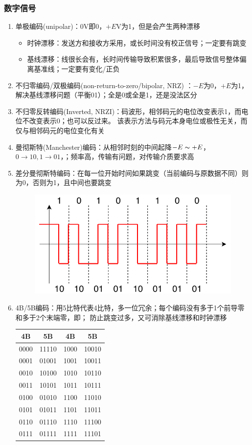 \subsubsection{数字信号}
\begin{enumerate}
\item 单极编码(unipolar)：0V即0，$+E$V为1，但是会产生两种漂移
\begin{itemize}
	\item 时钟漂移：发送方和接收方采用，或长时间没有校正信号；一定要有跳变
	\item 基线漂移：线很长会有，长时间传输导致积累很多，最后导致信号整体偏离基准线；一定要有变化/正负
\end{itemize}
\item 不归零编码/双极编码(non-return-to-zero/bipolar, NRZ) ：$-E$为0，$+E$为1，解决基线漂移问题（平衡01）；全是0或全是1，还是没法区分
\item 不归零反转编码(Inverted, NRZI)：码波形，相邻码元的电位改变表示1，而电位不改变表示0；也可以反过来。 该表示方法与码元本身电位或极性无关，而仅与相邻码元的电位变化有关
\item 曼彻斯特(Manchester)编码：从相邻时刻的中间起降$-E\thicksim +E$，$0\to 10, 1\to 01$，；频率高，传输有问题，对传输介质要求高
\item 差分曼彻斯特编码：在每一位开始时间如果跳变（当前编码与原数据不同）则为0，否则为1，且中间也要跳变
\begin{figure}[H]
	\centering
	\includegraphics[width=0.5\linewidth]{fig/network-manchester.pdf}
\end{figure}
\item 4B/5B编码：用5比特代表4比特，多一位冗余；每个编码没有多于1个前导零和多于2个末端零，即；
防止跳变过多，又可消除基线漂移和时钟漂移
\begin{center}
\begin{tabular}{|c|c||c|c|}\hline
4B & 5B & 4B & 5B\\\hline\hline
0000 & 11110 & 1000 & 10010\\\hline
0001 & 01001 & 1001 & 10011\\\hline
0010 & 10100 & 1010 & 10110\\\hline
0011 & 10101 & 1011 & 10111\\\hline
0100 & 01010 & 1100 & 11010\\\hline
0101 & 01011 & 1101 & 11011\\\hline
0110 & 01110 & 1110 & 11100\\\hline
0111 & 01111 & 1111 & 11101\\\hline
\end{tabular}
\end{center}
\end{enumerate}

